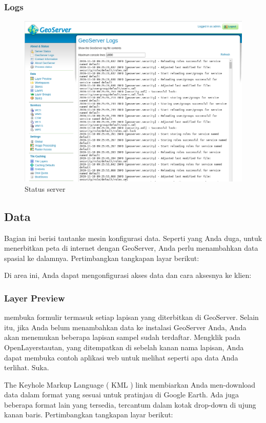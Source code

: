 \documentclass[]{book}
\begin{document}
\hypertarget{logs}{%
\subsubsection{Logs}\label{logs}}

\begin{figure}

{\centering \includegraphics[width=0.6\linewidth]{images/08/gs5} 

}

\caption{Status server}\label{fig:gs5}
\end{figure}

\hypertarget{data-1}{%
\subsection{Data}\label{data-1}}

Bagian ini berisi tautanke mesin konfigurasi data. Seperti yang Anda duga, untuk menerbitkan peta di internet dengan GeoServer, Anda perlu menambahkan data spasial ke dalamnya. Pertimbangkan tangkapan layar berikut:

Di area ini, Anda dapat mengonfigurasi akses data dan cara aksesnya ke klien:

\hypertarget{layer-preview}{%
\subsubsection{Layer Preview}\label{layer-preview}}

membuka formulir termasuk setiap lapisan yang diterbitkan di GeoServer. Selain itu, jika Anda belum menambahkan data ke instalasi GeoServer Anda, Anda akan menemukan beberapa lapisan sampel sudah terdaftar. Mengklik pada OpenLayerstautan, yang ditempatkan di sebelah kanan nama lapisan, Anda dapat membuka contoh aplikasi web untuk melihat seperti apa data Anda terlihat. Suka.

The Keyhole Markup Language ( KML ) link membiarkan Anda men-download data dalam format yang sesuai untuk pratinjau di Google Earth. Ada juga beberapa format lain yang tersedia, tercantum dalam kotak drop-down di ujung kanan baris. Pertimbangkan tangkapan layar berikut:
\end{document}
